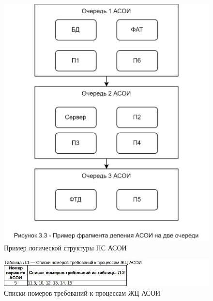 \documentclass[12pt, a4paper, simple]{eskdtext}
\begin{document}



    \begin{figure}[ph!]
        \centering
        \includegraphics[width=12cm]
            {_docs/Рисунок3-3ПримерФрагментаДеленияАСОИНаДвеОчереди.png}
        \caption{Пример логической структуры ПС АСОИ}
    \end{figure}

    \newpage

    \begin{figure}[p!]
        \centering
        \includegraphics[]
            {_docs/ТаблицаЛ1СпискиНомеровТребованийКПроцессамЖЦАСОИ.jpg}
        \caption{Списки номеров требований к процессам ЖЦ АСОИ}
    \end{figure}
\end{document}
